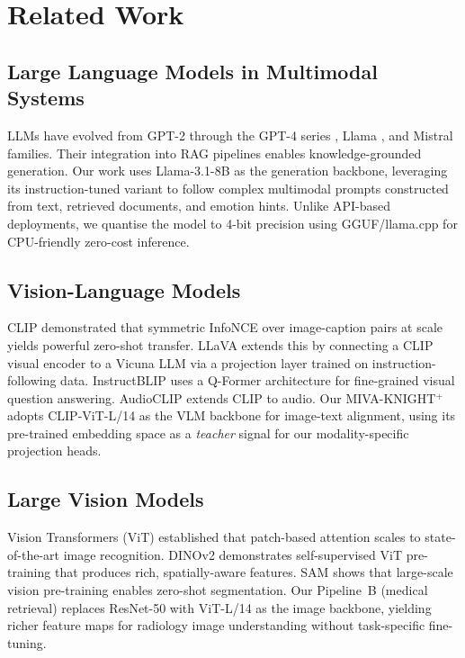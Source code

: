 \documentclass[10pt,conference]{IEEEtran}
\theoremstyle{ieeethm}
\theoremstyle{ieeedef}
\theoremstyle{ieeeremark}
\begin{document}
\section{Related Work}
\label{sec:related}

\subsection{Large Language Models in Multimodal Systems}

LLMs have evolved from GPT-2 \cite{radford2019language} through the GPT-4 series \cite{achiam2023gpt4}, Llama \cite{touvron2023llama}, and Mistral \cite{jiang2023mistral} families. Their integration into RAG pipelines \cite{lewis2020retrieval} enables knowledge-grounded generation. Our work uses Llama-3.1-8B as the generation backbone, leveraging its instruction-tuned variant to follow complex multimodal prompts constructed from text, retrieved documents, and emotion hints. Unlike API-based deployments, we quantise the model to 4-bit precision using GGUF/llama.cpp for CPU-friendly zero-cost inference.

\subsection{Vision-Language Models}

CLIP \cite{radford2021learning} demonstrated that symmetric InfoNCE over image-caption pairs at scale yields powerful zero-shot transfer. LLaVA \cite{liu2023llava} extends this by connecting a CLIP visual encoder to a Vicuna LLM via a projection layer trained on instruction-following data. InstructBLIP \cite{dai2023instructblip} uses a Q-Former architecture for fine-grained visual question answering. AudioCLIP \cite{guzhov2022audioclip} extends CLIP to audio. Our MIVA-KNIGHT$^+$ adopts CLIP-ViT-L/14 as the VLM backbone for image-text alignment, using its pre-trained embedding space as a \emph{teacher} signal for our modality-specific projection heads.

\subsection{Large Vision Models}

Vision Transformers (ViT) \cite{dosovitskiy2020image} established that patch-based attention scales to state-of-the-art image recognition. DINOv2 \cite{oquab2024dinov2} demonstrates self-supervised ViT pre-training that produces rich, spatially-aware features. SAM \cite{kirillov2023sam} shows that large-scale vision pre-training enables zero-shot segmentation. Our Pipeline~B (medical retrieval) replaces ResNet-50 with ViT-L/14 as the image backbone, yielding richer feature maps for radiology image understanding without task-specific fine-tuning.
\end{document}

